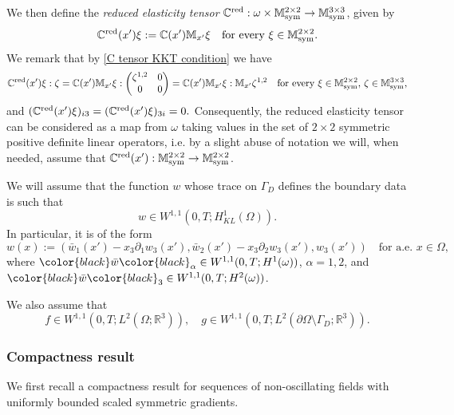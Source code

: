 \documentclass[reqno,10pt]{amsart}
\numberwithin{equation}{section}
\theoremstyle{remark}
\newcommand{\BLACK}{\color{black}}
\newcommand{\PINK}{\color{black}}
\newcommand{\C}{\mathbb{C}}
\newcommand{\M}{\mathbb{M}}
\newcommand{\R}{\mathbb{R}}
\DeclareMathOperator{\sym}{sym}
\newcommand{\fvol}{f}
\newcommand{\fsurf}{g}
\newcommand{\red}[1]{#1^{\rm red}}
\begin{document}
We then define the \emph{reduced elasticity tensor} $\red{\C} : \omega \times \M^{2 \times 2}_{\sym} \to \M^{3 \times 3}_{\sym}$, given by
\[
\red{\C}(x') \xi := \C(x') \M_{x'} \xi \quad \text{for every } \xi \in \M^{2 \times 2}_{\sym}.
\]
We remark that by \eqref{C tensor KKT condition} we have
\begin{equation} \label{Cred 2x2 : 3x3}
	\red{\C}(x') \xi : \zeta = \C(x') \M_{x'} \xi : \begin{pmatrix} \zeta^{1,2} & 0 \\ 0 & 0 \end{pmatrix} = \C(x') \M_{x'} \xi : \M_{x'} \zeta^{1,2} \quad\text{for every } \xi\in \M^{2 \times 2}_{\sym},\,\zeta \in \M^{3 \times 3}_{\sym},
\end{equation}
and 
$
(\red{\C}(x') \xi)_{i3} = (\red{\C}(x') \xi)_{3i} = 0.
$
Consequently, the reduced elasticity tensor can be considered as a map from $\omega$ taking values in the set of $2 \times 2$ symmetric positive definite linear operators, i.e. by a slight abuse of notation we will, when needed, assume that $\red{\C}(x'): \M^{2 \times 2}_{\sym} \to \M^{2 \times 2}_{\sym}$.


\medskip
{}

We will assume that the function $w$ whose trace on $\Gamma_D$ defines the boundary data is such that 
\begin{equation} \label{assbd} 
	w \in W^{1,1} (0,T;H^1_{KL}(\Omega)). 
\end{equation}
In particular, it is of the form 
\[
	w(x):=(\bar{w}_1(x')-{x_3}\partial_1 w_3(x'), \bar{w}_2(x')-x_3\partial_2 w_3(x'), w_3(x'))\quad\text{for a.e.\ }x \in \Omega, 
\]
where ${\PINK\bar{w}\BLACK}_\alpha \in W^{1,1}(0,T;H^1(\omega))$, $\alpha=1,2$, and ${\PINK\bar{w}\BLACK}_3 \in W^{1,1}(0,T;H^2(\omega))$.

We also assume that 
\begin{equation} \label{assloads} 
	\fvol \in W^{1,1}(0,T;L^2(\Omega;\R^3)), \quad \fsurf \in W^{1,1}(0,T;L^2(\partial \Omega \setminus \Gamma_D;\R^3)). 
\end{equation}

\subsubsection{Compactness result}
We first recall a compactness result for sequences of non-oscillating fields with uniformly bounded scaled symmetric gradients.
\end{document}
